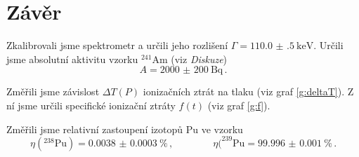 \section*{Závěr}
Zkalibrovali jsme spektrometr a určili jeho rozlišení $\Gamma= \SI{110.0(5)}{\keV}$.
Určili jsme absolutní aktivitu vzorku $^{241}$Am (viz \emph{Diskuze})
\begin{equation*}
A=\SI{2000(200)}{\becquerel} \,.
\end{equation*}

Změřili jsme závislost $\Delta T(P)$ ionizačních ztrát na tlaku (viz graf \ref{g:deltaT}). Z ní jsme určili specifické ionizační ztráty $f(t)$ (viz graf \ref{g:f}).



Změřili jsme relativní zastoupení izotopů Pu ve vzorku
\begin{equation*}
\eta(^{238}\text{Pu}) = \SI{0.0038(3)}{\percent}
 \,, \qquad \qquad \eta(^{239}\text{Pu} = \SI{99.996(1)}{\percent} \,.
\end{equation*}
